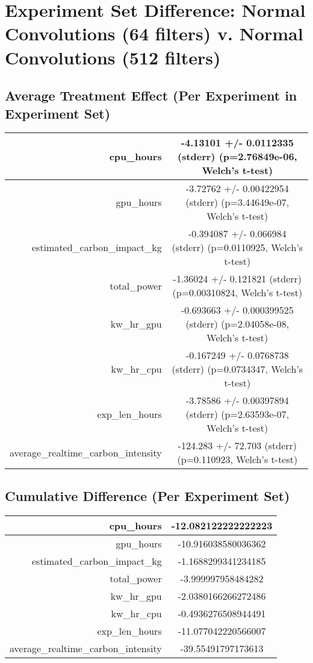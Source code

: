 \documentclass{article}%
\begin{document}
%
\normalsize%
\section{Experiment Set Difference: Normal Convolutions (64 filters) v. Normal Convolutions (512 filters)}%
\label{sec:Experiment Set Difference Normal Convolutions (64 filters) v. Normal Convolutions (512 filters)}%
\subsection{Average Treatment Effect (Per Experiment in Experiment Set)}%
\label{subsec:Average Treatment Effect (Per Experiment in Experiment Set)}%
\begin{tabular}{|r|c|}%
\hline%
cpu\_hours&{-}4.13101 +/{-} 0.0112335 (stderr) (p=2.76849e{-}06, Welch's t{-}test)\\%
\hline%
gpu\_hours&{-}3.72762 +/{-} 0.00422954 (stderr) (p=3.44649e{-}07, Welch's t{-}test)\\%
\hline%
estimated\_carbon\_impact\_kg&{-}0.394087 +/{-} 0.066984 (stderr) (p=0.0110925, Welch's t{-}test)\\%
\hline%
total\_power&{-}1.36024 +/{-} 0.121821 (stderr) (p=0.00310824, Welch's t{-}test)\\%
\hline%
kw\_hr\_gpu&{-}0.693663 +/{-} 0.000399525 (stderr) (p=2.04058e{-}08, Welch's t{-}test)\\%
\hline%
kw\_hr\_cpu&{-}0.167249 +/{-} 0.0768738 (stderr) (p=0.0734347, Welch's t{-}test)\\%
\hline%
exp\_len\_hours&{-}3.78586 +/{-} 0.00397894 (stderr) (p=2.63593e{-}07, Welch's t{-}test)\\%
\hline%
average\_realtime\_carbon\_intensity&{-}124.283 +/{-} 72.703 (stderr) (p=0.110923, Welch's t{-}test)\\%
\hline%
\end{tabular}

%
\subsection{Cumulative Difference (Per Experiment Set)}%
\label{subsec:Cumulative Difference (Per Experiment Set)}%
\begin{tabular}{|r|c|}%
\hline%
cpu\_hours&{-}12.082122222222223\\%
\hline%
gpu\_hours&{-}10.916038580036362\\%
\hline%
estimated\_carbon\_impact\_kg&{-}1.1688299341234185\\%
\hline%
total\_power&{-}3.999997958484282\\%
\hline%
kw\_hr\_gpu&{-}2.0380166266272486\\%
\hline%
kw\_hr\_cpu&{-}0.4936276508944491\\%
\hline%
exp\_len\_hours&{-}11.077042220566007\\%
\hline%
average\_realtime\_carbon\_intensity&{-}39.55491797173613\\%
\hline%
\end{tabular}

%
\end{document}
